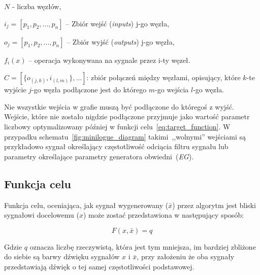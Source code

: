 $N$ - liczba węzłów,

$i_{j} = [ p_1, p_2, \ldots, p_n ]$ -- Zbiór wejść (\textit{inputs}) j-go węzła,

$o_{j} = [ p_1, p_2, \ldots, p_n ]$ -- Zbiór wyjść (\textit{outputs}) j-go węzła,

$f_i(x)$ -- operacja wykonywana na sygnale przez i-ty węzeł. %

$C = [ \{ o_{(j, k)}, i_{(l, m)} \}, \ldots ] $: zbiór połączeń między węzłami, opisujący, które 
$k$-te wyjście $j$-go węzła podłączone jest do którego $m$-go wejścia $l$-go węzła.

Nie wszystkie wejścia w grafie muszą być podłączone do któregoś z wyjść.
Wejście, które nie zostało nigdzie podłączone przyjmuje jako wartość parametr 
liczbowy optymalizowany później w funkcji celu~\ref{eq:target_function}.
W przypadku schematu~\ref{fig:minilogue_diagram} takimi~,,wolnymi'' wejściami są przykładowo
sygnał określający częstotliwość odciącia filtru sygnału lub parametry określające parametry
generatora obwiedni~(\textit{EG}).


\subsection{Funkcja celu}

Funkcja celu, oceniająca, jak sygnał wygenerowany ($\bar{x}$) przez algorytm jest bliski sygnałowi docelowemu ($x$)
może zostać przedstawiona w następujący sposób:

\begin{equation}
  F(x, \bar{x}) = q
  \label{eq:target_function}
\end{equation}

\noindent
Gdzie $q$ oznacza liczbę rzeczywistą, która jest tym mniejsza, im bardziej zbliżone do siebie są barwy dźwięku sygnałów $x$ i $\bar{x}$,
przy założeniu że oba sygnały przedstawiają dźwięk o tej samej częstotliwości podstawowej.

